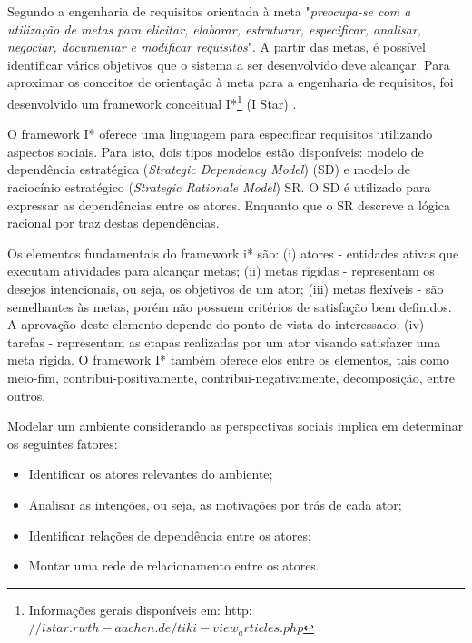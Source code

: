 Segundo  a engenharia de requisitos orientada à meta "\textit{preocupa-se com a utilização de metas para elicitar, elaborar, estruturar, especificar, analisar, negociar, documentar e modificar requisitos}". A partir das metas, é possível identificar vários objetivos que o sistema a ser desenvolvido deve alcançar. Para aproximar os conceitos de orientação à meta para a engenharia de requisitos, foi desenvolvido um framework conceitual I*\footnote{Informações gerais disponíveis em: http:$//istar.rwth-aachen.de/tiki-view_articles.php$} (I Star) \cite{yu1996}.

O framework I* oferece uma linguagem para especificar requisitos utilizando aspectos sociais. Para isto, dois tipos modelos estão disponíveis: modelo de dependência estratégica (\textit{Strategic Dependency Model}) (SD) e modelo de raciocínio estratégico (\textit{Strategic Rationale Model}) SR. O SD é utilizado para expressar as dependências entre os atores. Enquanto que o SR descreve a lógica racional por traz destas dependências.   

Os elementos fundamentais do framework i* são: (i) atores - entidades ativas que executam atividades para alcançar metas; (ii) metas rígidas - representam os desejos intencionais, ou seja, os objetivos de um ator; (iii) metas flexíveis - são semelhantes às metas, porém não possuem critérios de satisfação bem definidos. A aprovação deste elemento depende do ponto de vista do interessado; (iv) tarefas - representam as etapas realizadas por um ator visando satisfazer uma meta rígida. O framework I* também oferece elos entre os elementos, tais como meio-fim, contribui-positivamente, contribui-negativamente, decomposição, entre outros.  

Modelar um ambiente considerando as perspectivas sociais implica em determinar os seguintes fatores:
\begin{itemize}
\item Identificar os atores relevantes do ambiente;
\item Analisar as intenções, ou seja, as motivações por trás de cada ator;
\item Identificar relações de dependência entre os atores;
\item Montar uma rede de relacionamento entre os atores.
\end{itemize}

